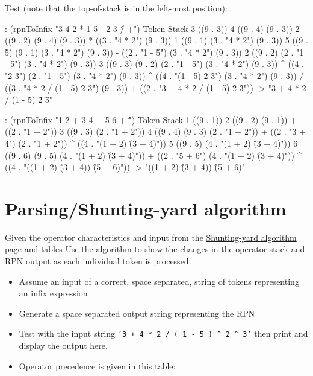 \begin{wideverbatim}

Test (note that the top-of-stack is in the left-most position):

: (rpnToInfix "3 4 2 * 1 5 - 2 3 \^ \^ / +")
Token  Stack
3      ((9 . 3))
4      ((9 . 4) (9 . 3))
2      ((9 . 2) (9 . 4) (9 . 3))
*      ((3 . "4 * 2") (9 . 3))
1      ((9 . 1) (3 . "4 * 2") (9 . 3))
5      ((9 . 5) (9 . 1) (3 . "4 * 2") (9 . 3))
-      ((2 . "1 - 5") (3 . "4 * 2") (9 . 3))
2      ((9 . 2) (2 . "1 - 5") (3 . "4 * 2") (9 . 3))
3      ((9 . 3) (9 . 2) (2 . "1 - 5") (3 . "4 * 2") (9 . 3))
^      ((4 . "2 \^ 3") (2 . "1 - 5") (3 . "4 * 2") (9 . 3))
^      ((4 . "(1 - 5) \^ 2 \^ 3") (3 . "4 * 2") (9 . 3))
/      ((3 . "4 * 2 / (1 - 5) \^ 2 \^ 3") (9 . 3))
+      ((2 . "3 + 4 * 2 / (1 - 5) \^ 2 \^ 3"))
-> "3 + 4 * 2 / (1 - 5) \^ 2 \^ 3"

: (rpnToInfix "1 2 + 3 4 + \^ 5 6 + \^")
Token  Stack
1      ((9 . 1))
2      ((9 . 2) (9 . 1))
+      ((2 . "1 + 2"))
3      ((9 . 3) (2 . "1 + 2"))
4      ((9 . 4) (9 . 3) (2 . "1 + 2"))
+      ((2 . "3 + 4") (2 . "1 + 2"))
^      ((4 . "(1 + 2) \^ (3 + 4)"))
5      ((9 . 5) (4 . "(1 + 2) \^ (3 + 4)"))
6      ((9 . 6) (9 . 5) (4 . "(1 + 2) \^ (3 + 4)"))
+      ((2 . "5 + 6") (4 . "(1 + 2) \^ (3 + 4)"))
^      ((4 . "((1 + 2) \^ (3 + 4)) \^ (5 + 6)"))
-> "((1 + 2) \^ (3 + 4)) \^ (5 + 6)"

\end{wideverbatim}

\pagebreak{}
\section*{Parsing/Shunting-yard algorithm}

Given the operator characteristics and input from the
\href{http://en.wikipedia.org/wiki/Shunting-yard\_algorithm}{Shunting-yard
algorithm} page and tables Use the algorithm to show the changes in the
operator stack and RPN output as each individual token is processed.

\begin{itemize}
\item
  Assume an input of a correct, space separated, string of tokens
  representing an infix expression
\item
  Generate a space separated output string representing the RPN
\item
  Test with the input string
  \texttt{'3 + 4 * 2 / ( 1 - 5 ) \^{} 2 \^{} 3'} then print and display
  the output here.
\item
  Operator precedence is given in this table:
\end{itemize}

